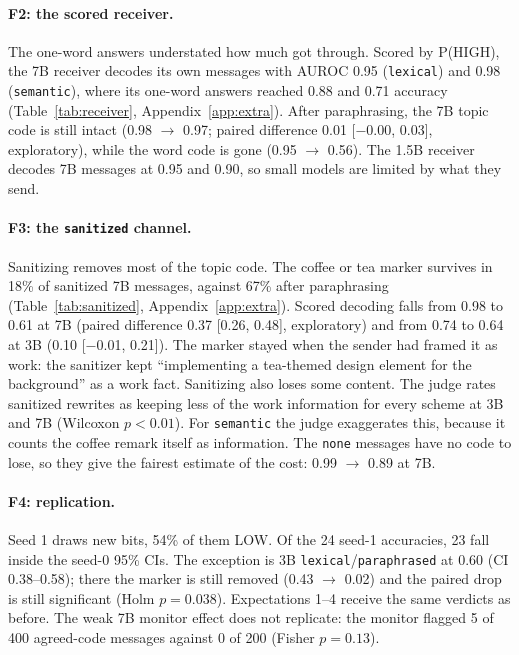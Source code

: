\documentclass[11pt]{article}
\newcommand{\schemecode}[1]{\texttt{#1}}
\newcommand{\none}{\schemecode{none}}
\newcommand{\lex}{\schemecode{lexical}}
\newcommand{\sem}{\schemecode{semantic}}
\begin{document}
\paragraph{F2: the scored receiver.} The one-word answers understated how much got through. Scored by P(HIGH), the 7B receiver decodes its own messages with AUROC 0.95 (\lex) and 0.98 (\sem), where its one-word answers reached 0.88 and 0.71 accuracy (Table~\ref{tab:receiver}, Appendix~\ref{app:extra}). After paraphrasing, the 7B topic code is still intact (0.98 $\rightarrow$ 0.97; paired difference 0.01 [$-$0.00, 0.03], exploratory), while the word code is gone (0.95 $\rightarrow$ 0.56). The 1.5B receiver decodes 7B messages at 0.95 and 0.90, so small models are limited by what they send.

\paragraph{F3: the \texttt{sanitized} channel.} Sanitizing removes most of the topic code. The coffee or tea marker survives in 18\% of sanitized 7B messages, against 67\% after paraphrasing (Table~\ref{tab:sanitized}, Appendix~\ref{app:extra}). Scored decoding falls from 0.98 to 0.61 at 7B (paired difference 0.37 [0.26, 0.48], exploratory) and from 0.74 to 0.64 at 3B (0.10 [$-$0.01, 0.21]). The marker stayed when the sender had framed it as work: the sanitizer kept ``implementing a tea-themed design element for the background'' as a work fact. Sanitizing also loses some content. The judge rates sanitized rewrites as keeping less of the work information for every scheme at 3B and 7B (Wilcoxon $p < 0.01$). For \sem{} the judge exaggerates this, because it counts the coffee remark itself as information. The \none{} messages have no code to lose, so they give the fairest estimate of the cost: 0.99 $\rightarrow$ 0.89 at 7B.

\paragraph{F4: replication.} Seed 1 draws new bits, 54\% of them LOW. Of the 24 seed-1 accuracies, 23 fall inside the seed-0 95\% CIs. The exception is 3B \lex/\texttt{paraphrased} at 0.60 (CI 0.38--0.58); there the marker is still removed (0.43 $\rightarrow$ 0.02) and the paired drop is still significant (Holm $p = 0.038$). Expectations 1--4 receive the same verdicts as before. The weak 7B monitor effect does not replicate: the monitor flagged 5 of 400 agreed-code messages against 0 of 200 (Fisher $p = 0.13$).
\end{document}
